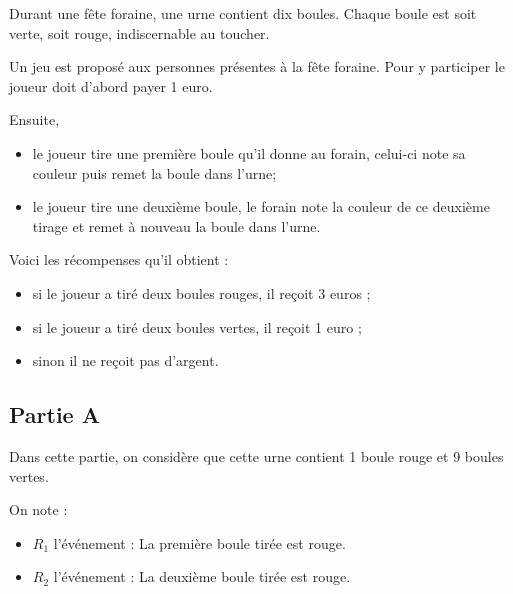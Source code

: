 Durant une fête foraine, une urne contient dix boules. Chaque boule est soit verte, soit rouge, indiscernable au toucher.

	Un jeu est proposé aux personnes présentes à la fête foraine. Pour y participer le joueur doit d'abord payer 1 euro.

	Ensuite,
	\begin{itemize}[left=5mm,label={\textbullet~~}]
		\item le joueur tire une première boule qu'il donne au forain, celui-ci note sa couleur puis remet la boule dans l'urne;

		\item le joueur tire une deuxième boule, le forain note la couleur de ce deuxième tirage et remet à nouveau la boule dans l'urne.
	\end{itemize}

	Voici les récompenses qu'il obtient :
	\begin{itemize}[left=5mm,label={\textbullet~~}]
		\item si le joueur a tiré deux boules rouges, il reçoit 3 euros ;
		\item si le joueur a tiré deux boules vertes, il reçoit 1 euro ;
		\item sinon il ne reçoit pas d'argent.
	\end{itemize}

\subsection*{Partie A}
Dans cette partie, on considère que cette urne contient 1 boule rouge et 9 boules vertes.

On note :

\begin{itemize}[left=5mm,label={\textbullet~~}]
	\item $R_{1}$ l'événement : \og La première boule tirée est rouge. \fg{}
	\item $R_{2}$ l'événement : \og La deuxième boule tirée est rouge. \fg{}
\end{itemize}

